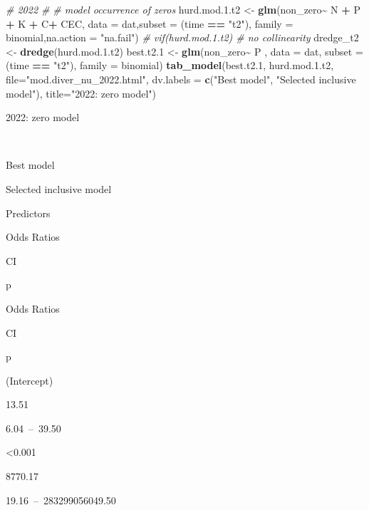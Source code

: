 \documentclass[
]{article}
\newenvironment{Shaded}{\begin{snugshade}}{\end{snugshade}}
\newcommand{\AttributeTok}[1]{\textcolor[rgb]{0.13,0.29,0.53}{#1}}
\newcommand{\CommentTok}[1]{\textcolor[rgb]{0.56,0.35,0.01}{\textit{#1}}}
\newcommand{\FloatTok}[1]{\textcolor[rgb]{0.00,0.00,0.81}{#1}}
\newcommand{\FunctionTok}[1]{\textcolor[rgb]{0.13,0.29,0.53}{\textbf{#1}}}
\newcommand{\NormalTok}[1]{#1}
\newcommand{\OtherTok}[1]{\textcolor[rgb]{0.56,0.35,0.01}{#1}}
\newcommand{\SpecialCharTok}[1]{\textcolor[rgb]{0.81,0.36,0.00}{\textbf{#1}}}
\newcommand{\StringTok}[1]{\textcolor[rgb]{0.31,0.60,0.02}{#1}}
\begin{document}
\begin{Shaded}
\begin{Highlighting}[]
\CommentTok{\# 2022 \#}
\CommentTok{\# model occurrence of zeros}
\NormalTok{hurd.mod.}\FloatTok{1.}\NormalTok{t2 }\OtherTok{\textless{}{-}} \FunctionTok{glm}\NormalTok{(non\_zero}\SpecialCharTok{\textasciitilde{}}\NormalTok{ N }\SpecialCharTok{+}\NormalTok{ P }\SpecialCharTok{+}\NormalTok{ K }\SpecialCharTok{+}\NormalTok{ C}\SpecialCharTok{+}\NormalTok{ CEC, }\AttributeTok{data =}\NormalTok{ dat,}\AttributeTok{subset =}\NormalTok{ (time }\SpecialCharTok{==} \StringTok{"t2"}\NormalTok{), }\AttributeTok{family =}\NormalTok{ binomial,}\AttributeTok{na.action =} \StringTok{"na.fail"}\NormalTok{)}
\CommentTok{\# vif(hurd.mod.1.t2) \# no collinearity}
\NormalTok{dredge\_t2 }\OtherTok{\textless{}{-}} \FunctionTok{dredge}\NormalTok{(hurd.mod.}\FloatTok{1.}\NormalTok{t2)}
\NormalTok{best.t2}\FloatTok{.1} \OtherTok{\textless{}{-}} \FunctionTok{glm}\NormalTok{(non\_zero}\SpecialCharTok{\textasciitilde{}}\NormalTok{ P , }\AttributeTok{data =}\NormalTok{ dat, }\AttributeTok{subset =}\NormalTok{ (time }\SpecialCharTok{==} \StringTok{"t2"}\NormalTok{), }\AttributeTok{family =}\NormalTok{ binomial)}
\FunctionTok{tab\_model}\NormalTok{(best.t2}\FloatTok{.1}\NormalTok{, hurd.mod.}\FloatTok{1.}\NormalTok{t2, }\AttributeTok{file=}\StringTok{"mod.diver\_nu\_2022.html"}\NormalTok{, }\AttributeTok{dv.labels =} \FunctionTok{c}\NormalTok{(}\StringTok{"Best model"}\NormalTok{, }\StringTok{"Selected inclusive model"}\NormalTok{), }\AttributeTok{title=}\StringTok{"2022: zero model"}\NormalTok{)}
\end{Highlighting}
\end{Shaded}

2022: zero model

~

Best model

Selected inclusive model

Predictors

Odds Ratios

CI

p

Odds Ratios

CI

p

(Intercept)

13.51

6.04~--~39.50

\textless0.001

8770.17

19.16~--~283299056049.50
\end{document}
